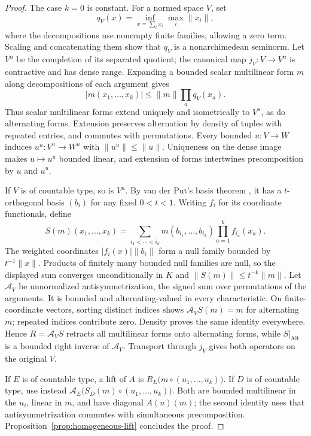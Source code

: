 \documentclass[11pt]{amsart}
\theoremstyle{definition}
\theoremstyle{remark}
\numberwithin{equation}{section}
\newcommand{\Alt}{\operatorname{Alt}}
\newcommand{\abs}[1]{\lvert #1\rvert}
\newcommand{\norm}[1]{\lVert #1\rVert}
\begin{document}
\begin{proof}
The case $k=0$ is constant. For a normed space $V$, set
\[
 q_V(x)=\inf_{x=\sum_i x_i}\max_i\norm{x_i},
\]
where the decompositions use nonempty finite families, allowing a zero term. Scaling and concatenating them show that
$q_V$ is a nonarchimedean seminorm. Let $V^u$ be the completion of its separated quotient;
the canonical map $j_V\colon V\to V^u$ is contractive and has dense range.
Expanding a bounded scalar multilinear form $m$ along decompositions of each argument gives
\[
 \abs{m(x_1,\ldots,x_k)}\le\norm m\prod_a q_V(x_a).
\]
Thus scalar multilinear forms extend uniquely and isometrically to $V^u$, as do
alternating forms. Extension preserves alternation by density of tuples with repeated
entries, and commutes with permutations. Every bounded $u\colon V\to W$ induces
$u^u\colon V^u\to W^u$ with $\norm{u^u}\le\norm u$. Uniqueness on the dense image makes
$u\mapsto u^u$ bounded linear, and extension of forms intertwines precomposition by $u$ and $u^u$.

If $V$ is of countable type, so is $V^u$. By van der Put's basis theorem
\cite[Proposition~1.4]{VdP}, it has a $t$\nobreakdash-orthogonal basis $(b_i)$ for any
fixed $0<t<1$. Writing $f_i$ for its coordinate functionals, define
\[
 S(m)(x_1,\ldots,x_k)
 =\sum_{i_1<\cdots<i_k}m(b_{i_1},\ldots,b_{i_k})
                        \prod_{a=1}^k f_{i_a}(x_a).
\]
The weighted coordinates $\abs{f_i(x)}\norm{b_i}$ form a null family bounded by
$t^{-1}\norm x$. Products of finitely many bounded null families are null, so the
displayed sum converges unconditionally in $K$ and $\norm{S(m)}\le t^{-k}\norm m$.
Let $\mathcal A_V$ be unnormalized antisymmetrization, the signed sum over permutations
of the arguments. It is bounded and alternating-valued in every characteristic.
On finite-coordinate vectors, sorting distinct indices shows
$\mathcal A_V S(m)=m$ for alternating $m$; repeated indices contribute zero.
Density proves the same identity everywhere. Hence $R=\mathcal A_V S$ retracts all
multilinear forms onto alternating forms, while $S|_{\Alt}$ is a bounded right inverse
of $\mathcal A_V$. Transport through $j_V$ gives both operators on the original $V$.

If $E$ is of countable type, a lift of $A$ is
$R_E\bigl(m\circ(u_1,\ldots,u_k)\bigr)$.
If $D$ is of countable type, use instead
$\mathcal A_E\bigl(S_D(m)\circ(u_1,\ldots,u_k)\bigr)$.
Both are bounded multilinear in the $u_i$, linear in $m$, and have diagonal $A(u)(m)$;
the second identity uses that antisymmetrization commutes with simultaneous precomposition.
Proposition~\ref{prop:homogeneous-lift} concludes the proof.
\end{proof}
\end{document}
